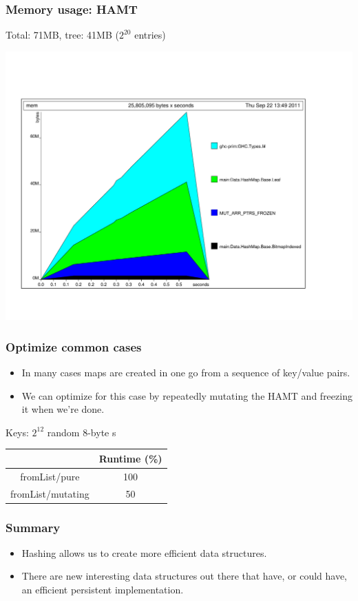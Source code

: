 \documentclass[xetex,mathserif,serif]{beamer}
\newcommand{\code}[1]{\mbox{\texttt{\small{\color{CodeColor}{#1}}}}}
\begin{document}
\begin{frame}
  \frametitle{Memory usage: HAMT}

  Total: 71MB, tree: 41MB ($2^{20}$ \code{Int} entries)
  \begin{center}
  \includegraphics[angle=90,scale=0.3]{hamt-mem.pdf}
  \end{center}
\end{frame}

\begin{frame}
  \frametitle{Optimize common cases}
  \begin{itemize}
  \item In many cases maps are created in one go from a sequence of
    key/value pairs.
  \item We can optimize for this case by repeatedly mutating the HAMT
    and freezing it when we're done.
  \end{itemize}

  \bigskip
  Keys: $2^{12}$ random 8-byte \code{ByteString}s

  \bigskip
  \begin{center}
  \begin{tabular}{c|c}
                         & Runtime (\%) \\
    \hline fromList/pure & 100 \\
           fromList/mutating & 50 \\
  \end{tabular}
  \end{center}
\end{frame}

\begin{frame}
  \frametitle{Summary}
  \begin{itemize}
  \item Hashing allows us to create more efficient data structures.
  \item There are new interesting data structures out there that have,
    or could have, an efficient persistent implementation.
  \end{itemize}
\end{frame}
\end{document}
